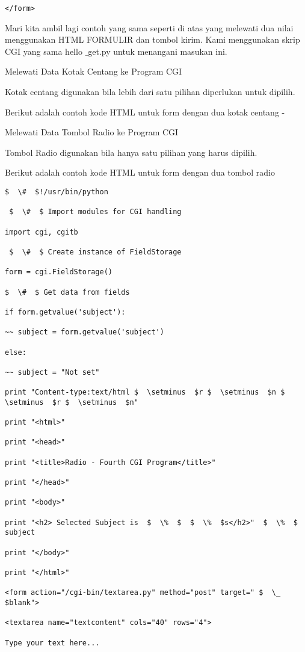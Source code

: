 \begin {enumerate}
\begin {enumerate}
\begin{verbatim}
</form>

\end{verbatim}
Mari kita ambil lagi contoh yang sama seperti di atas yang melewati dua nilai menggunakan HTML FORMULIR dan tombol kirim. Kami menggunakan skrip CGI yang sama hello $  \_  $get.py untuk menangani masukan ini.

Melewati Data Kotak Centang ke Program CGI

Kotak centang digunakan bila lebih dari satu pilihan diperlukan untuk dipilih.

Berikut adalah contoh kode HTML untuk form dengan dua kotak centang -

Melewati Data Tombol Radio ke Program CGI

Tombol Radio digunakan bila hanya satu pilihan yang harus dipilih.

Berikut adalah contoh kode HTML untuk form dengan dua tombol radio
\begin{verbatim}
$  \#  $!/usr/bin/python

 $  \#  $ Import modules for CGI handling

import cgi, cgitb

 $  \#  $ Create instance of FieldStorage

form = cgi.FieldStorage()

$  \#  $ Get data from fields

if form.getvalue('subject'):

~~ subject = form.getvalue('subject')

else:

~~ subject = "Not set"

print "Content-type:text/html $  \setminus  $r $  \setminus  $n $  \setminus  $r $  \setminus  $n"

print "<html>"

print "<head>"

print "<title>Radio - Fourth CGI Program</title>"

print "</head>"

print "<body>"

print "<h2> Selected Subject is  $  \%  $  $  \%  $s</h2>"  $  \%  $ subject

print "</body>"

print "</html>"

<form action="/cgi-bin/textarea.py" method="post" target=" $  \_  $blank">

<textarea name="textcontent" cols="40" rows="4">

Type your text here...


\end{verbatim}
\end{enumerate}
\end{enumerate}
